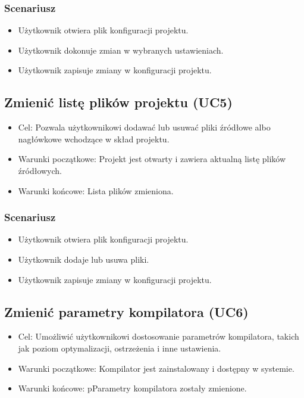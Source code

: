 \subsubsection{Scenariusz}
\begin{itemize}
    \item Użytkownik otwiera plik konfiguracji projektu.
    \item Użytkownik dokonuje zmian w wybranych ustawieniach.
    \item Użytkownik zapisuje zmiany w konfiguracji projektu.
\end{itemize}

\subsection{Zmienić listę plików projektu (UC5)}
\begin{itemize}
    \item Cel: Pozwala użytkownikowi dodawać lub usuwać pliki źródłowe albo nagłówkowe wchodzące w skład projektu.
    \item Warunki początkowe: Projekt jest otwarty i zawiera aktualną listę plików źródłowych.
    \item Warunki końcowe: Lista plików zmieniona.
\end{itemize}

\subsubsection{Scenariusz}
\begin{itemize}
    \item Użytkownik otwiera plik konfiguracji projektu.
    \item Użytkownik dodaje lub usuwa pliki.
    \item Użytkownik zapisuje zmiany w konfiguracji projektu.
\end{itemize}

\subsection{Zmienić parametry kompilatora (UC6)}
\begin{itemize}
    \item Cel: Umożliwić użytkownikowi dostosowanie parametrów kompilatora, takich jak poziom optymalizacji, ostrzeżenia i inne ustawienia.
    \item Warunki początkowe: Kompilator jest zainstalowany i dostępny w systemie.
    \item Warunki końcowe: pParametry kompilatora zostały zmienione.
\end{itemize}

